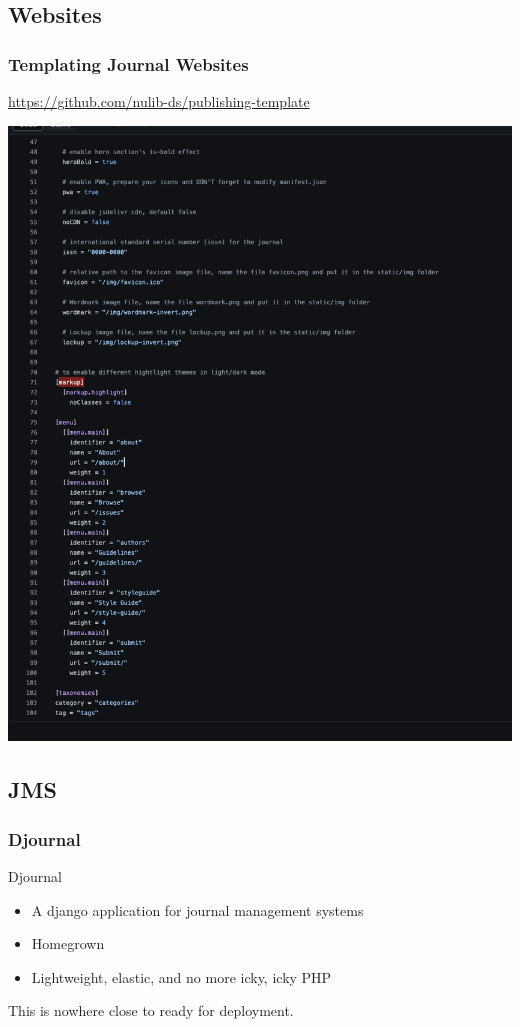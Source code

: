 \documentclass[aspectratio=169,9pt,xcolor=dvipsnames]{beamer}
\begin{document}
\subsection{Websites}
\begin{frame}
    \frametitle{Templating Journal Websites}
    \begin{center}
    \url{https://github.com/nulib-ds/publishing-template}
    \begin{center}
        \includegraphics[width=\textwidth, height=\textheight, keepaspectratio]{config.png}
    \end{center}
    \end{center}
\end{frame}

\subsection{JMS}
\begin{frame}
    \frametitle{Djournal}
    \begin{center}
        \begin{block}{Djournal}
            \begin{itemize}
                \item A django application for journal management systems
                \item Homegrown
                \item Lightweight, elastic, and no more icky, icky PHP
            \end{itemize}
        \end{block}
    This is nowhere close to ready for deployment.
    \end{center}
    
\end{frame}
\end{document}
